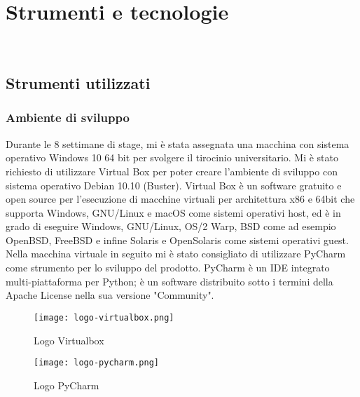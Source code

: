
\chapter{Strumenti e tecnologie}
\label{cap:strumenti-e-tecnologie}

\\

\section{Strumenti utilizzati}

\subsection{Ambiente di sviluppo}
Durante le 8 settimane di stage, mi è stata assegnata una macchina con sistema operativo Windows 10 64 bit per svolgere il tirocinio universitario. Mi è stato richiesto di utilizzare Virtual Box per poter creare l'ambiente di sviluppo con sistema operativo Debian 10.10 (Buster). \newline{} Virtual Box è un software gratuito e open source per l'esecuzione di macchine virtuali per architettura x86 e 64bit che supporta Windows, GNU/Linux e macOS come sistemi operativi host, ed è in grado di eseguire Windows, GNU/Linux, OS/2 Warp, BSD come ad esempio OpenBSD, FreeBSD e infine Solaris e OpenSolaris come sistemi operativi guest.\newline{}
Nella macchina virtuale in seguito mi è stato consigliato di utilizzare PyCharm come strumento per lo sviluppo del prodotto.\newline{}
PyCharm è un IDE integrato multi-piattaforma per Python; è un software distribuito sotto i termini della Apache License nella sua versione "Community".
\begin{figure}[!h] 
    \centering 
    \texttt{[image: logo-virtualbox.png]} 
    \caption{Logo Virtualbox}
\end{figure}

\begin{figure}[!h] 
    \centering 
    \texttt{[image: logo-pycharm.png]} 
    \caption{Logo PyCharm}
\end{figure}

